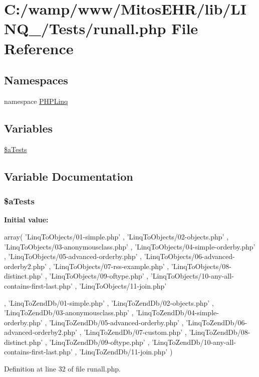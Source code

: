 \hypertarget{runall_8php}{\section{\-C\-:/wamp/www/\-Mitos\-E\-H\-R/lib/\-L\-I\-N\-Q\-\_/\-Tests/runall.php \-File \-Reference}
\label{runall_8php}
}
\subsection*{\-Namespaces}
\begin{DoxyCompactItemize}
\item 
namespace \hyperlink{namespace_p_h_p_linq}{\-P\-H\-P\-Linq}
\end{DoxyCompactItemize}
\subsection*{\-Variables}
\begin{DoxyCompactItemize}
\item 
\hyperlink{runall_8php_a6bcb754742b8bb05260b347bb9ba78c6}{\$a\-Tests}
\end{DoxyCompactItemize}


\subsection{\-Variable \-Documentation}
\hypertarget{runall_8php_a6bcb754742b8bb05260b347bb9ba78c6}{
\subsubsection[{\$a\-Tests}]{\setlength{\rightskip}{0pt plus 5cm}\$a\-Tests}}\label{runall_8php_a6bcb754742b8bb05260b347bb9ba78c6}
{\bfseries \-Initial value\-:}
\begin{DoxyCode}
 array(
          'LinqToObjects/01-simple.php'
        , 'LinqToObjects/02-objects.php'
        , 'LinqToObjects/03-anonymousclass.php'
        , 'LinqToObjects/04-simple-orderby.php'
        , 'LinqToObjects/05-advanced-orderby.php'
        , 'LinqToObjects/06-advanced-orderby2.php'
        , 'LinqToObjects/07-rss-example.php'
        , 'LinqToObjects/08-distinct.php'
        , 'LinqToObjects/09-oftype.php'
        , 'LinqToObjects/10-any-all-contains-first-last.php'
        , 'LinqToObjects/11-join.php'
        
        , 'LinqToZendDb/01-simple.php'
        , 'LinqToZendDb/02-objects.php'
        , 'LinqToZendDb/03-anonymousclass.php'
        , 'LinqToZendDb/04-simple-orderby.php'
        , 'LinqToZendDb/05-advanced-orderby.php'
        , 'LinqToZendDb/06-advanced-orderby2.php'
        , 'LinqToZendDb/07-custom.php'
        , 'LinqToZendDb/08-distinct.php'
        , 'LinqToZendDb/09-oftype.php'
        , 'LinqToZendDb/10-any-all-contains-first-last.php'
        , 'LinqToZendDb/11-join.php'
)
\end{DoxyCode}


\-Definition at line 32 of file runall.\-php.

